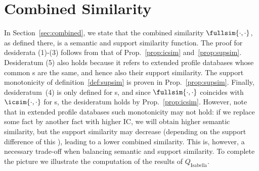 \section{Combined Similarity}
\label{comb}
In Section~\ref{sec:combined}, we state that the combined similarity $\fullsim{\cdot,\cdot}$, as defined there, is a semantic and support similarity function. The proof for desiderata (1)-(3) follows from that
of Prop.~\ref{prop:icsim} and~\ref{prop:supsim}. Desideratum (5)
also holds because it refers to extended profile databases whose common \fset{}s are the same, and hence also their support similarity. The
support monotonicity of definition~\ref{def:supsim} is proven in
Prop.~\ref{prop:supsim}. Finally, desideratum~(4) is only defined
for \fset{}s, and since $\fullsim{\cdot,\cdot}$ coincides with
$\icsim{\cdot,\cdot}$ for \fset{}s, the desideratum holds by
Prop.~\ref{prop:icsim}. However, note that in extended profile databases such
monotonicity may not hold: if we replace some fact by another
fact with higher IC, we will obtain higher semantic similarity, but
the support similarity may decrease (depending on the support
difference of this \fset{}), leading to a lower combined similarity.
This is, however, a necessary trade-off when balancing semantic and
support similarity. To complete the picture we illustrate the computation of the results
of $Q_{\textrm{Isabella}}$.
